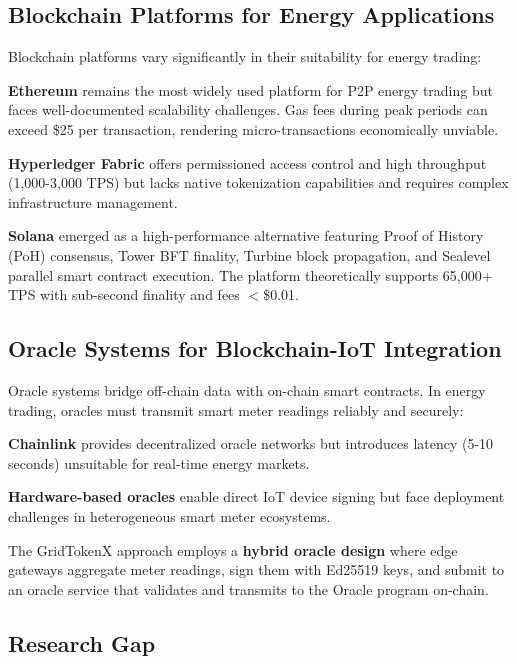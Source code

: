\documentclass[conference]{IEEEtran}
\begin{document}
\subsection{Blockchain Platforms for Energy Applications}

Blockchain platforms vary significantly in their suitability for energy trading:

\textbf{Ethereum} \cite{wood2014} remains the most widely used platform for P2P energy trading but faces well-documented scalability challenges. Gas fees during peak periods can exceed \$25 per transaction, rendering micro-transactions economically unviable.

\textbf{Hyperledger Fabric} \cite{hyperledger2026} offers permissioned access control and high throughput (1,000-3,000 TPS) but lacks native tokenization capabilities and requires complex infrastructure management.

\textbf{Solana} \cite{yakovenko2018} emerged as a high-performance alternative featuring Proof of History (PoH) consensus, Tower BFT finality, Turbine block propagation, and Sealevel parallel smart contract execution. The platform theoretically supports 65,000+ TPS with sub-second finality and fees $<$\$0.01.

\subsection{Oracle Systems for Blockchain-IoT Integration}

Oracle systems bridge off-chain data with on-chain smart contracts. In energy trading, oracles must transmit smart meter readings reliably and securely:

\textbf{Chainlink} \cite{chainlink2019} provides decentralized oracle networks but introduces latency (5-10 seconds) unsuitable for real-time energy markets.

\textbf{Hardware-based oracles} \cite{dorri2019} enable direct IoT device signing but face deployment challenges in heterogeneous smart meter ecosystems.

The GridTokenX approach employs a \textbf{hybrid oracle design} where edge gateways aggregate meter readings, sign them with Ed25519 keys, and submit to an oracle service that validates and transmits to the Oracle program on-chain.

\subsection{Research Gap}
\end{document}
